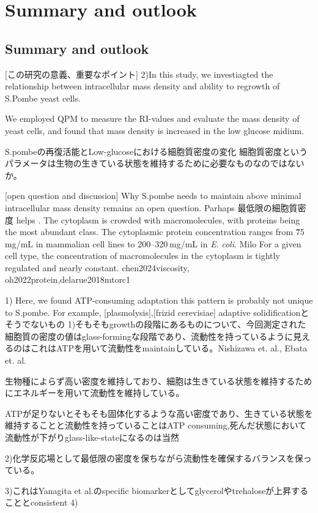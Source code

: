 \chapter{Summary and outlook}
\section{Summary and outlook}
[この研究の意義、重要なポイント]
2)In this study, we investiagted the relationship between intracellular mass density and ability to regrowth of S.Pombe yeast cells.

We employed QPM to measure the RI-values and evaluate the mass density of yeast cells, and found that mass density is increased in the low glucose midium.

S.pombeの再復活能とLow-glucoseにおける細胞質密度の変化
細胞質密度というパラメータは生物の生きている状態を維持するために必要なものなのではないか。

[open question and discussion]
Why S.pombe needs to maintain above minimal intracellular mass density remains an open question. 
Parhaps 最低限の細胞質密度 helps .
The cytoplasm is crowded with macromolecules, with proteins being the most abundant class. 
The cytoplasmic protein concentration ranges from \~75 mg/mL in mammalian cell lines to 200–320 mg/mL in \textit{E}. \textit{coli}. Milo
For a given cell type, the concentration of macromolecules in the cytoplasm is tightly regulated and nearly constant. chen2024viscosity, oh2022protein,delarue2018mtorc1

1) Here, we found ATP-consuming adaptation
this pattern is probably not unique to S.pombe. For example, [plasmolysis],[frizid cerevisiae]
adaptive solidificationとそうでないもの
1)そもそもgrowthの段階にあるものについて、今回測定された細胞質の密度の値はglass-formingな段階であり、流動性を持っているように見えるのはこれはATPを用いて流動性をmaintainしている。Nishizawa et. al., Ebata et. al.

生物種によらず高い密度を維持しており、細胞は生きている状態を維持するためにエネルギーを用いて流動性を維持している。

ATPが足りないとそもそも固体化するような高い密度であり、生きている状態を維持することと流動性を持っていることはATP consuming,死んだ状態において流動性が下がりglass-like-stateになるのは当然

2)化学反応場として最低限の密度を保ちながら流動性を確保するバランスを保っている。

3)これはYanagita et al.のspecific biomarkerとしてglycerolやtrehaloseが上昇することとconsistent
4)

